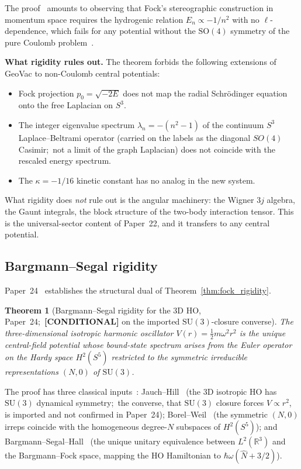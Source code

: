 \documentclass[twocolumn,pra,amsmath,amssymb,superscriptaddress]{revtex4-2}
\newtheorem{theorem}{Theorem}
\begin{document}
The proof~\cite{paper23} amounts to observing that Fock's
stereographic construction in momentum space requires the hydrogenic
relation $E_n \propto -1/n^2$ with no $\ell$-dependence, which fails
for any potential without the $\mathrm{SO}(4)$ symmetry of the pure
Coulomb problem~\cite{bander_itzykson1966}.

\medskip\noindent\textbf{What rigidity rules out.}  The theorem
forbids the following extensions of GeoVac to non-Coulomb central
potentials:
\begin{itemize}
\item Fock projection $p_0 = \sqrt{-2E}$ does not map the radial
  Schr\"odinger equation onto the free Laplacian on $S^3$.
\item The integer eigenvalue spectrum $\lambda_n = -(n^2 - 1)$ of
  the continuum $S^3$ Laplace--Beltrami operator (carried on the labels
  as the diagonal $SO(4)$ Casimir;\ not a limit of the graph Laplacian)
  does not coincide with the rescaled energy spectrum.
\item The $\kappa = -1/16$ kinetic constant has no analog in the
  new system.
\end{itemize}
What rigidity does \emph{not} rule out is the angular machinery: the
Wigner $3j$ algebra, the Gaunt integrals, the block structure of the
two-body interaction tensor.  This is the universal-sector content
of Paper~22, and it transfers to any central potential.

\subsection{Bargmann--Segal rigidity}
\label{sec:bs_rigidity}

Paper~24~\cite{paper24} establishes the structural dual of
Theorem~\ref{thm:fock_rigidity}.

\begin{theorem}[Bargmann--Segal rigidity for the 3D HO, Paper~24;\
\textbf{[CONDITIONAL]} on the imported $\mathrm{SU}(3)$-closure converse]
\label{thm:bs_rigidity}
The three-dimensional isotropic harmonic oscillator
$V(r) = \tfrac{1}{2} m\omega^2 r^2$ is the unique central-field
potential whose bound-state spectrum arises from the Euler operator
on the Hardy space $H^2(S^5)$ restricted to the symmetric
irreducible representations $(N, 0)$ of $\mathrm{SU}(3)$.
\end{theorem}

The proof has three classical inputs~\cite{paper24}:
Jauch--Hill~\cite{jauchhill1940} (the 3D isotropic HO has
$\mathrm{SU}(3)$ dynamical symmetry;\ the converse, that $\mathrm{SU}(3)$
closure forces $V \propto r^2$, is imported and not confirmed in
Paper~24);
Borel--Weil~\cite{borelweil} (the symmetric $(N, 0)$ irreps coincide
with the homogeneous degree-$N$ subspaces of $H^2(S^5)$); and
Bargmann--Segal--Hall~\cite{bargmann1961,hall1994} (the unique
unitary equivalence between $L^2(\mathbb{R}^3)$ and the
Bargmann--Fock space, mapping the HO Hamiltonian to
$\hbar\omega(\hat{N} + 3/2)$).
\end{document}
